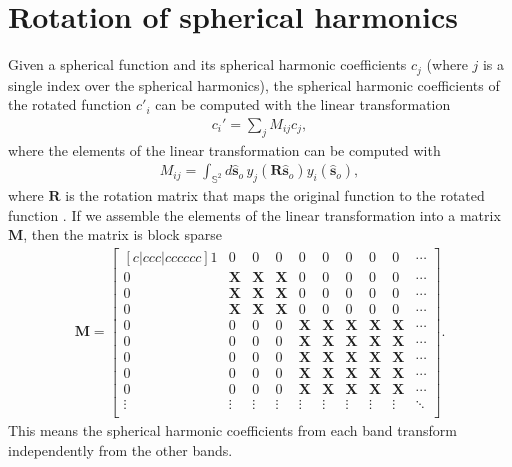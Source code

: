\documentclass[11pt]{article}
\providecommand{\so}[1]{\mathbf{\hat{s}}_o}
\providecommand{\rd}[1]{\mathbf{r}_d}
\providecommand{\mh}[1]{\mathbf{\hat{#1}}}
\begin{document}

\appendix
\section{Rotation of spherical harmonics} \label{sec:sh} Given a spherical
function and its spherical harmonic coefficients $c_j$ (where $j$ is a single
index over the spherical harmonics), the spherical harmonic coefficients of the
rotated function $c'_i$ can be computed with the linear transformation
\begin{align}
  c_i' = \sum_j M_{ij}c_j, 
\end{align}
where the elements of the linear transformation can be computed with
\begin{align}
  M_{ij} = \int_{\mathbb{S}^2} d\so{}\, y_j(\mathbf{R}\so{})y_i(\so{}), 
\end{align}
where $\mathbf{R}$ is the rotation matrix that maps the original function to the
rotated function \cite{kautz2002}. If we assemble the elements of the linear transformation into
a matrix $\mathbf{M}$, then the matrix is block sparse
\begin{align}
  \mathbf{M} =
  \begin{bmatrix}[c|ccc|cccccc]    
    1&0&0&0&0&0&0&0&0&\cdots\\ \hline
    0&\mathbf{X}&\mathbf{X}&\mathbf{X}&0&0&0&0&0&\cdots\\
    0&\mathbf{X}&\mathbf{X}&\mathbf{X}&0&0&0&0&0&\cdots\\
    0&\mathbf{X}&\mathbf{X}&\mathbf{X}&0&0&0&0&0&\cdots\\ \hline
    0&0&0&0&\mathbf{X}&\mathbf{X}&\mathbf{X}&\mathbf{X}&\mathbf{X}&\cdots\\
    0&0&0&0&\mathbf{X}&\mathbf{X}&\mathbf{X}&\mathbf{X}&\mathbf{X}&\cdots\\
    0&0&0&0&\mathbf{X}&\mathbf{X}&\mathbf{X}&\mathbf{X}&\mathbf{X}&\cdots\\
    0&0&0&0&\mathbf{X}&\mathbf{X}&\mathbf{X}&\mathbf{X}&\mathbf{X}&\cdots\\
    0&0&0&0&\mathbf{X}&\mathbf{X}&\mathbf{X}&\mathbf{X}&\mathbf{X}&\cdots\\    
    \vdots&\vdots&\vdots&\vdots&\vdots&\vdots&\vdots&\vdots&\vdots&\ddots\\        
  \end{bmatrix}.
\end{align}
This means the spherical harmonic coefficients from each band transform
independently from the other bands.
\end{document}
